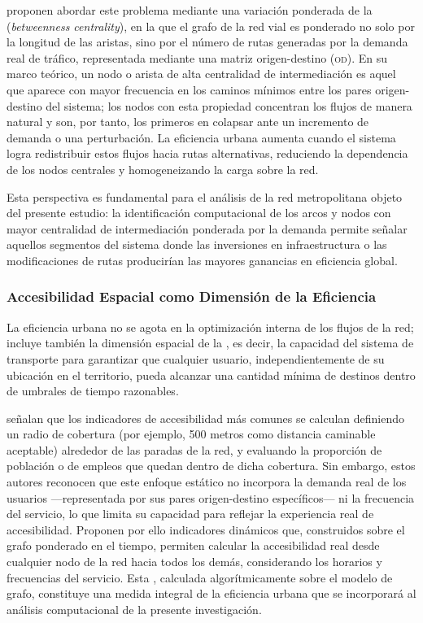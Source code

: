 \textcite{batista2015} proponen abordar este problema mediante una variación
ponderada de la  (\textit{betweenness
centrality}), en la que el grafo de la red vial es ponderado no solo por la longitud de
las aristas, sino por el número de rutas generadas por la demanda real de tráfico,
representada mediante una matriz origen-destino (\textsc{od}). En su marco teórico,
un nodo o arista de alta centralidad de intermediación es aquel que aparece con mayor
frecuencia en los caminos mínimos entre los pares origen-destino del sistema; los
nodos con esta propiedad concentran los flujos de manera natural y son, por tanto,
los primeros en colapsar ante un incremento de demanda o una perturbación. La
eficiencia urbana aumenta cuando el sistema logra redistribuir estos flujos hacia rutas
alternativas, reduciendo la dependencia de los nodos centrales y homogeneizando
la carga sobre la red.

Esta perspectiva es fundamental para el análisis de la red metropolitana objeto del
presente estudio: la identificación computacional de los arcos y nodos con mayor
centralidad de intermediación ponderada por la demanda permite señalar aquellos
segmentos del sistema donde las inversiones en infraestructura o las modificaciones
de rutas producirían las mayores ganancias en eficiencia global.
 \subsubsection{Accesibilidad Espacial como Dimensión de la Eficiencia}
\label{subsubsec:accesibilidad-espacial}

La eficiencia urbana no se agota en la optimización interna de los flujos de la red;
incluye también la dimensión espacial de la , es decir, la
capacidad del sistema de transporte para garantizar que cualquier usuario,
independientemente de su ubicación en el territorio, pueda alcanzar una cantidad
mínima de destinos dentro de umbrales de tiempo razonables.

\textcite{fortin2016innovative} señalan que los indicadores de accesibilidad más comunes se
calculan definiendo un radio de cobertura (por ejemplo, 500 metros como distancia
caminable aceptable) alrededor de las paradas de la red, y evaluando la proporción
de población o de empleos que quedan dentro de dicha cobertura. Sin embargo, estos
autores reconocen que este enfoque estático no incorpora la demanda real de los
usuarios ---representada por sus pares origen-destino específicos--- ni la frecuencia
del servicio, lo que limita su capacidad para reflejar la experiencia real de
accesibilidad. Proponen por ello indicadores dinámicos que, construidos sobre el
grafo ponderado en el tiempo, permiten calcular la accesibilidad real desde cualquier
nodo de la red hacia todos los demás, considerando los horarios y frecuencias del
servicio. Esta , calculada algorítmicamente sobre el
modelo de grafo, constituye una medida integral de la eficiencia urbana que se
incorporará al análisis computacional de la presente investigación.

